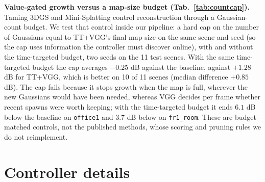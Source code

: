 \documentclass[10pt,twocolumn,letterpaper]{article}
\begin{document}
\textbf{Value-gated growth versus a map-size budget (Tab.~\ref{tab:countcap}).}
Taming 3DGS and Mini-Splatting control reconstruction through a Gaussian-count budget. We test that control inside our pipeline: a hard cap on the number of Gaussians equal to TT+VGG's final map size on the same scene and seed (so the cap uses information the controller must discover online), with and without the time-targeted budget, two seeds on the 11 test scenes. With the same time-targeted budget the cap averages $-0.25$ dB against the baseline, against $+1.28$ dB for TT+VGG, which is better on 10 of 11 scenes (median difference $+0.85$ dB). The cap fails because it stops growth when the map is full, wherever the new Gaussians would have been needed, whereas VGG decides per frame whether recent spawns were worth keeping; with the time-targeted budget it ends $6.1$ dB below the baseline on \texttt{office1} and $3.7$ dB below on \texttt{fr1\_room}. These are budget-matched controls, not the published methods, whose scoring and pruning rules we do not reimplement.


\section{Controller details}



\end{document}
